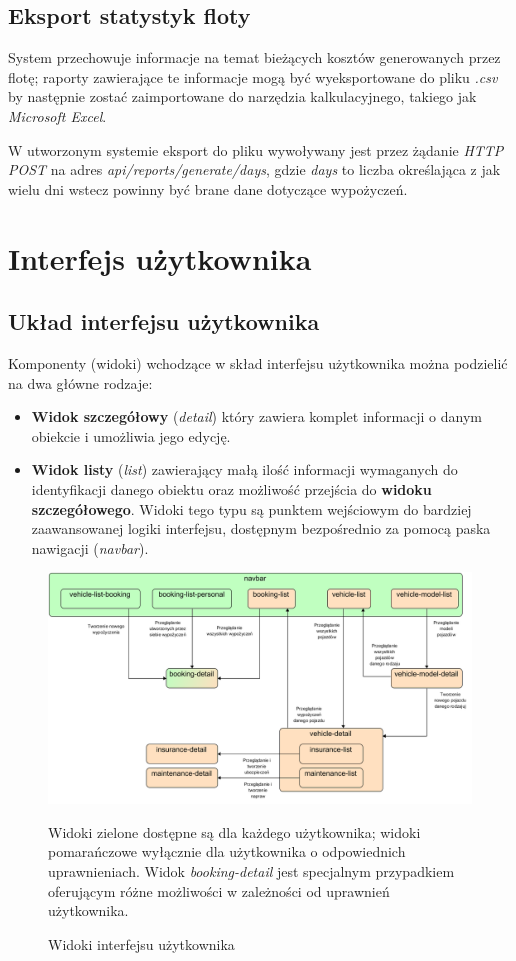 \documentclass[eng,printmode,openany]{mgr}
\begin{document}
\newpage
\subsection{Eksport statystyk floty}
System przechowuje informacje na temat bieżących kosztów generowanych przez flotę; raporty zawierające te informacje mogą być wyeksportowane do pliku \textit{.csv} by następnie zostać zaimportowane do narzędzia kalkulacyjnego, takiego jak \textit{Microsoft Excel}.

W utworzonym systemie eksport do pliku wywoływany jest przez żądanie \textit{HTTP POST} na adres \textit{api/reports/generate/days}, gdzie \textit{days} to liczba określająca z jak wielu dni wstecz powinny być brane dane dotyczące wypożyczeń.


\newpage
\section{Interfejs użytkownika}
\subsection{Układ interfejsu użytkownika}
Komponenty (widoki) wchodzące w skład interfejsu użytkownika można podzielić na dwa główne rodzaje:
\begin{itemize}
	\item \textbf{Widok szczegółowy} (\textit{detail}) który zawiera komplet informacji o danym obiekcie i umożliwia jego edycję.
	\item \textbf{Widok listy} (\textit{list}) zawierający małą ilość informacji wymaganych do identyfikacji danego obiektu oraz możliwość przejścia do \textbf{widoku szczegółowego}. Widoki tego typu są punktem wejściowym do bardziej zaawansowanej logiki interfejsu, dostępnym bezpośrednio za pomocą paska nawigacji (\textit{navbar}).
\end{itemize}
\begin{figure}[h]
	\centering
	\includegraphics[scale=0.62]{images/angular_views.png}
	\caption{Widoki interfejsu użytkownika}
	\small 
	Widoki zielone dostępne są dla każdego użytkownika; widoki pomarańczowe wyłącznie dla użytkownika o odpowiednich uprawnieniach. Widok \textit{booking-detail} jest specjalnym przypadkiem oferującym różne możliwości w zależności od uprawnień użytkownika.
\end{figure}
\end{document}
